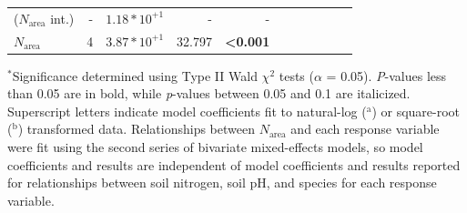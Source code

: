 \begin{landscape}
\begin{table}
{\begin{tabular}{p{2.5cm}p{0.5cm}p{2cm}p{1.5cm}p{1.5cm}p{2cm}p{1.5cm}p{1.5cm}p{2cm}p{1.5cm}p{1.5cm}}
        ($N_\mathrm{area}$ int.) & \multicolumn{1}{r}{-}
        & \multicolumn{1}{r}{$1.18*10^{+1}$} & \multicolumn{1}{r}{-} & \multicolumn{1}{r}{-}
        &&&&&& 
        \\

        $N_\mathrm{area}$ & \multicolumn{1}{r}{4}
        & \multicolumn{1}{r}{$3.87*10^{+1}$} & \multicolumn{1}{r}{32.797} & \multicolumn{1}{r}{\textbf{<0.001}}
        &&&&&
        \\
        \hline
    \end{tabular}}
    \label{tab:table3.4}
    \end{table}
\begin{singlespace}
    \noindent $^*$Significance determined using Type II Wald $\chi^{2}$ tests ($\alpha$ = 0.05). \textit{P}-values less than 0.05 are in bold, while \textit{p}-values between 0.05 and 0.1 are italicized. Superscript letters indicate model coefficients fit to natural-log ($^\mathrm{a}$) or square-root ($^\mathrm{b}$) transformed data. Relationships between $N_\mathrm{area}$ and each response variable were fit using the second series of bivariate mixed-effects models, so model coefficients and results are independent of model coefficients and results reported for relationships between soil nitrogen, soil pH, and species for each response variable.
\end{singlespace}
\end{landscape}
\clearpage

